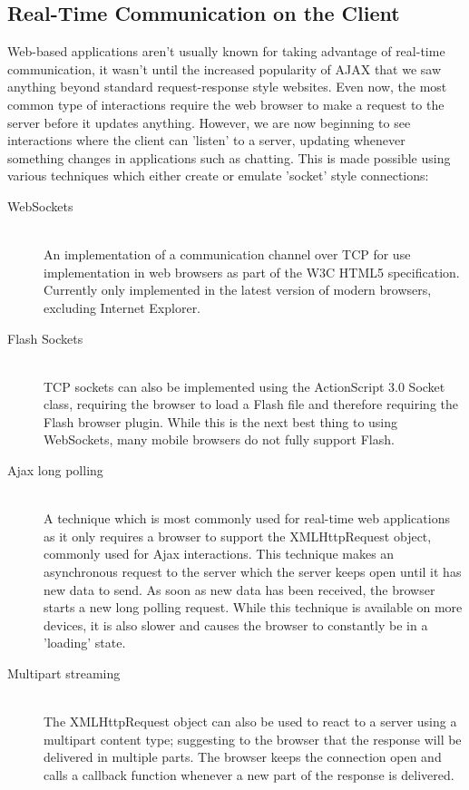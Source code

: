 \documentclass[a4papert,11pt,notitlepage]{ltxdoc}
\begin{document}
\subsection{Real-Time Communication on the Client}
Web-based applications aren't usually known for taking advantage of real-time communication, it wasn't until the increased popularity of AJAX that we saw anything beyond standard request-response style websites. Even now, the most common type of interactions require the web browser to make a request to the server before it updates anything. However, we are now beginning to see interactions where the client can 'listen' to a server, updating whenever something changes in applications such as chatting. This is made possible using various techniques which either create or emulate 'socket' style connections:
\begin{description}
\item[WebSockets] \hfill \\
An implementation of a communication channel over TCP for use implementation in web browsers as part of the W3C HTML5 specification. Currently only implemented in the latest version of modern browsers, excluding Internet Explorer.
\item[Flash Sockets] \hfill \\
TCP sockets can also be implemented using the ActionScript 3.0 Socket class, requiring the browser to load a Flash file and therefore requiring the Flash browser plugin. While this is the next best thing to using WebSockets, many mobile browsers do not fully support Flash.
\item[Ajax long polling] \hfill \\
A technique which is most commonly used for real-time web applications as it only requires a browser to support the XMLHttpRequest object, commonly used for Ajax interactions. This technique makes an asynchronous request to the server which the server keeps open until it has new data to send. As soon as new data has been received, the browser starts a new long polling request. While this technique is available on more devices, it is also slower and causes the browser to constantly be in a 'loading' state.
\item[Multipart streaming] \hfill \\
The XMLHttpRequest object can also be used to react to a server using a multipart content type; suggesting to the browser that the response will be delivered in multiple parts. The browser keeps the connection open and calls a callback function whenever a new part of the response is delivered.
\end{description}
\end{document}
